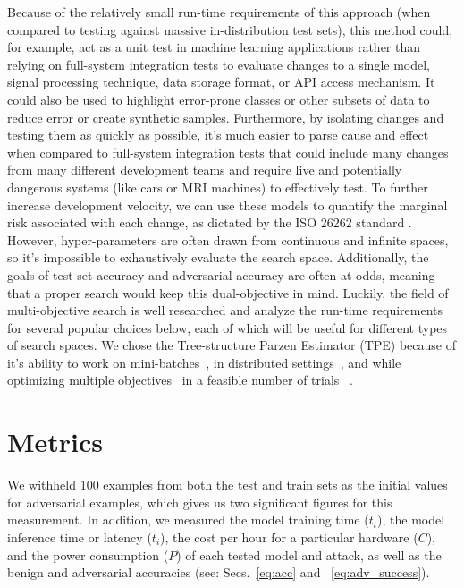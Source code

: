 \documentclass[conference]{IEEEtran}
\begin{document}
Because of the relatively small run-time requirements of this approach (when compared to testing against massive in-distribution test sets), this method could, for example, act as a unit test in machine learning applications rather than relying on full-system integration tests to evaluate changes to a single model, signal processing technique, data storage format, or API access mechanism. It could also be used to highlight error-prone classes or other subsets of data to reduce error or create synthetic samples. Furthermore, by isolating changes and testing them as quickly as possible, it's much easier to parse cause and effect when compared to full-system integration tests that could include many changes from many different development teams and require live and potentially dangerous systems (like cars or MRI machines) to effectively test. To further increase development velocity, we can use these models to quantify the marginal risk associated with each change, as dictated by the ISO 26262 standard \cite{iso26262}. However, hyper-parameters are often drawn from continuous and infinite spaces, so it's impossible to exhaustively evaluate the search space. Additionally, the goals of test-set accuracy and adversarial accuracy are often at odds, meaning that a proper search would keep this dual-objective in mind. Luckily, the field of multi-objective search is well researched and analyze the run-time requirements for several popular choices below, each of which will be useful for different types of search spaces. We chose the Tree-structure Parzen Estimator (TPE) because of it's ability to work on mini-batches~\cite{}, in distributed settings~\cite{}, and while optimizing multiple objectives~\cite{} in a feasible number of trials ~\cite{}. 




\section{Metrics}

We withheld 100 examples from both the test and train sets as the initial values for adversarial examples, which gives us two significant figures for this measurement. In addition, we measured the model training time ($t_{t}$), the model inference time or latency ($t_{i}$), the cost per hour for a particular hardware ($C$), and the power consumption ($P$) of each tested model and attack, as well as the benign and adversarial accuracies (see: Secs.~\ref{eq:acc} and ~\ref{eq:adv_success}).
\end{document}

